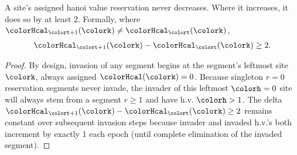 \begin{lemma}
\label{thm:tilted-invader-minus-invaded}
A site's assigned hanoi value reservation never decreases.
Where it increases, it does so by at least 2.
Formally, where $\colorHcal_{\colort + 1}(\colork) \neq \colorHcal_{\colort}(\colork)$,
\begin{align*}
\colorHcal_{\colort + 1}(\colork) - \colorHcal_{\colort}(\colork) \geq 2.
\end{align*}
\end{lemma}

\begin{proof}
By design, invasion of any segment begins at the segment's leftmost site $\colork$, always assigned $\colorHcal(\colork) = 0$.
Because singleton $r=0$ reservation segments never invade, the invader of this leftmost $\colorh = 0$ site will always stem from a segment $r \geq 1$ and have h.v. $\colorh > 1$.
The delta $\colorHcal_{\colort + 1}(\colork) - \colorHcal_{\colort}(\colork) \geq 2$ remains constant over subsequent invasion steps because invader and invaded h.v.'s both increment by exactly 1 each epoch (until complete elimination of the invaded segment).
\end{proof}

